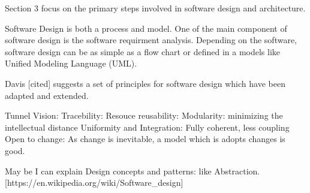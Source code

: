Section 3 focus on the primary steps involved in software design and architecture.


Software Design is both a process and model. One of the main component of software design is the software requirment analysis. Depending on the software, software design can be as simple as a flow chart or defined in a models like Unified Modeling Language (UML). 

Davis [cited] suggests a set of principles for software design which have been adapted and extended.

Tunnel Vision: 
Tracebility:
Resouce reusability:
Modularity: minimizing the intellectual distance
Uniformity and Integration: Fully coherent, less coupling
Open to change: As change is inevitable, a model which is adopts changes is good.

May be I can explain Design concepts and patterns: like Abstraction. [https://en.wikipedia.org/wiki/Software_design]


